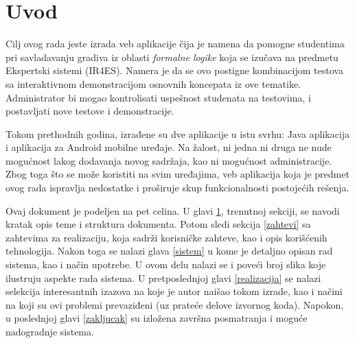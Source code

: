 \chapter{Uvod}\label{uvod}
Cilj ovog rada jeste izrada veb aplikacije čija je namena da pomogne studentima pri savladavanju gradiva iz oblasti \emph{formalne logike} koja se izučava na predmetu Ekspertski sistemi (IR4ES). Namera je da se ovo postigne kombinacijom testova sa interaktivnom demonstracijom osnovnih koncepata iz ove tematike. Administrator bi mogao kontrolisati uspešnost studenata na testovima, i postavljati nove testove i demonstracije.

Tokom prethodnih godina, izrađene su dve aplikacije u istu svrhu: Java aplikacija i aplikacija za Android mobilne uređaje. Na žalost, ni jedna ni druga ne nude mogućnost lakog dodavanja novog sadržaja, kao ni mogućnost administracije. Zbog toga što se može koristiti na svim uređajima, veb aplikacija koja je predmet ovog rada ispravlja nedostatke i proširuje skup funkcionalnosti postojećih rešenja.

Ovaj dokument je podeljen na pet celina. U glavi \ref{uvod}, trenutnoj sekciji, se navodi kratak opis teme i struktura dokumenta. Potom sledi sekcija \ref{zahtevi} sa zahtevima za realizaciju, koja sadrži korisničke zahteve, kao i opis korišćenih tehnologija. Nakon toga se nalazi glava \ref{sistem} u kome je detaljno opisan rad sistema, kao i način upotrebe. U ovom delu nalazi se i poveći broj slika koje ilustruju aspekte rada sistema. U pretposlednjoj glavi \ref{realizacija} se nalazi selekcija interesantnih izazova na koje je autor naišao tokom izrade, kao i načini na koji su ovi problemi prevaziđeni (uz prateće delove izvornog koda). Napokon, u poslednjoj glavi \ref{zakljucak} su izložena završna posmatranja i moguće nadogradnje sistema.